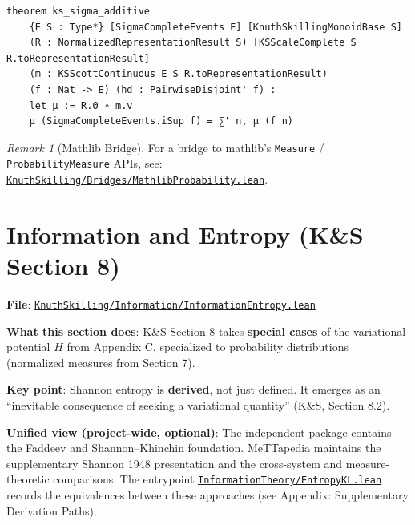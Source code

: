 \documentclass[11pt]{article}
\theoremstyle{definition}
\theoremstyle{remark}
\newtheorem{remark}[theorem]{Remark}
\begin{document}
\begin{lstlisting}[caption={$\sigma$-additivity theorem (signature)}]
theorem ks_sigma_additive
    {E S : Type*} [SigmaCompleteEvents E] [KnuthSkillingMonoidBase S]
    (R : NormalizedRepresentationResult S) [KSScaleComplete S R.toRepresentationResult]
    (m : KSScottContinuous E S R.toRepresentationResult)
    (f : Nat -> E) (hd : PairwiseDisjoint' f) :
    let μ := R.Θ ∘ m.v
    μ (SigmaCompleteEvents.iSup f) = ∑' n, μ (f n)
\end{lstlisting}

\begin{remark}[Mathlib Bridge]
For a bridge to mathlib's \texttt{Measure} / \texttt{ProbabilityMeasure} APIs, see:
\href{https://github.com/zariuq/ks-foundations-of-inference/blob/main/KnuthSkilling/Bridges/MathlibProbability.lean}{\texttt{KnuthSkilling/Bridges/MathlibProbability.lean}}.
\end{remark}

\section{Information and Entropy (K\&S Section 8)}

\textbf{File}: \href{https://github.com/zariuq/ks-foundations-of-inference/blob/main/KnuthSkilling/Information/InformationEntropy.lean}{\texttt{KnuthSkilling/Information/InformationEntropy.lean}}

\textbf{What this section does}: K\&S Section 8 takes \textbf{special cases} of the variational potential $H$ from Appendix C, specialized to probability distributions (normalized measures from Section 7).

\textbf{Key point}: Shannon entropy is \textbf{derived}, not just defined. It emerges as an ``inevitable consequence of seeking a variational quantity'' (K\&S, Section 8.2).

\textbf{Unified view (project-wide, optional)}: The independent package contains the Faddeev and Shannon--Khinchin foundation. MeTTapedia maintains the supplementary Shannon 1948 presentation and the cross-system and measure-theoretic comparisons. The entrypoint \href{https://github.com/zariuq/MeTTapedia/blob/main/lean/mettapedia/Mettapedia/InformationTheory/EntropyKL.lean}{\texttt{InformationTheory/EntropyKL.lean}} records the equivalences between these approaches (see Appendix: Supplementary Derivation Paths).
\end{document}
